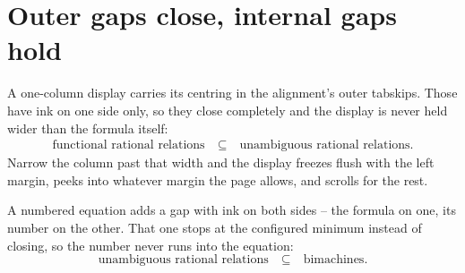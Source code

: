 \section*{Outer gaps close, internal gaps hold}
A one-column display carries its centring in the alignment's outer tabskips.
Those have ink on one side only, so they close completely and the display is
never held wider than the formula itself:
\begin{align*}
\text{functional rational relations} \quad \subseteq \quad \text{unambiguous rational relations.}
\end{align*}
Narrow the column past that width and the display freezes flush with the left
margin, peeks into whatever margin the page allows, and scrolls for the rest.

A numbered equation adds a gap with ink on both sides – the formula on one, its
number on the other. That one stops at the configured minimum instead of
closing, so the number never runs into the equation:
\begin{equation}
  \text{unambiguous rational relations} \quad \subseteq \quad \text{bimachines.}
\end{equation}
